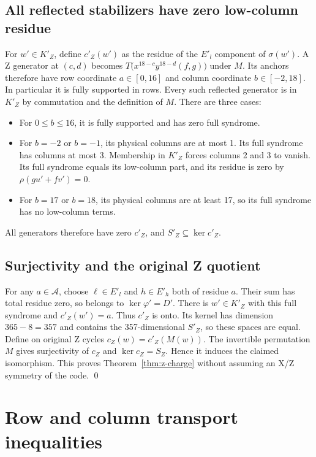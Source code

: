 \documentclass{article}
\begin{document}
\subsection{All reflected stabilizers have zero low-column residue}\label{sec:z-stabilizers}

For \(w' \in K'_Z\), define \(c'_Z(w')\) as the residue of the \(E'_l\) component of
\(\sigma(w')\). A Z generator at \((c,d)\) becomes
\(T\bigl(x^{18-c} y^{18-d} (f, g)\bigr)\) under \(M\). Its anchors therefore have row
coordinate \(a \in [0,16]\) and column coordinate \(b \in [-2,18]\). In particular it is
fully supported in rows. Every such reflected generator is in \(K'_Z\) by commutation and the
definition of \(M\). There are three cases:
\begin{itemize}
  \item For \(0 \le b \le 16\), it is fully supported and has zero full syndrome.
  \item For \(b = -2\) or \(b = -1\), its physical columns are at most 1. Its full syndrome
    has columns at most 3. Membership in \(K'_Z\) forces columns 2 and 3 to vanish. Its full
    syndrome equals its low-column part, and its residue is zero by
    \(\rho(gu' + fv') = 0\).
  \item For \(b = 17\) or \(b = 18\), its physical columns are at least 17, so its full
    syndrome has no low-column terms.
\end{itemize}
All generators therefore have zero \(c'_Z\), and \(S'_Z \subseteq \ker c'_Z\).

\subsection{Surjectivity and the original Z quotient}\label{sec:z-quotient}

For any \(a \in \mathcal{A}\), choose \(\ell \in E'_l\) and \(h \in E'_h\) both of residue
\(a\). Their sum has total residue zero, so belongs to \(\ker \varphi' = D'\). There is
\(w' \in K'_Z\) with this full syndrome and \(c'_Z(w') = a\). Thus \(c'_Z\) is onto. Its
kernel has dimension \(365 - 8 = 357\) and contains the 357-dimensional \(S'_Z\), so these
spaces are equal. Define on original Z cycles \(c_Z(w) = c'_Z(M(w))\). The invertible
permutation \(M\) gives surjectivity of \(c_Z\) and \(\ker c_Z = S_Z\). Hence it induces the
claimed isomorphism. This proves Theorem~\ref{thm:z-charge} without assuming an X/Z symmetry
of the code. \qed

\section{Row and column transport inequalities}\label{sec:transport}
\end{document}

